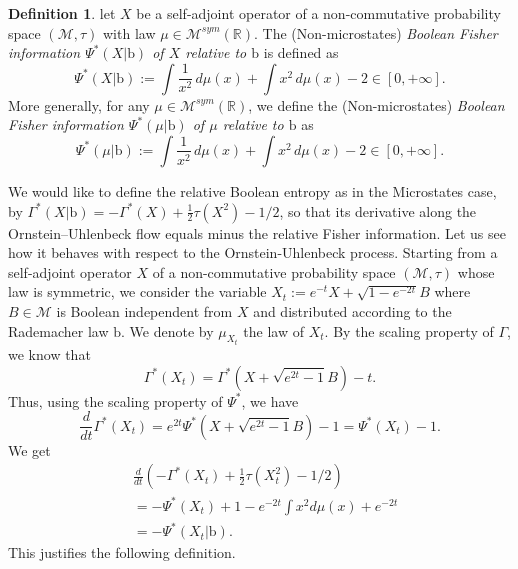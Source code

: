 \documentclass[10pt, reqno]{amsart}
\numberwithin{equation}{section}
\theoremstyle{definition}
\newtheorem{definition}{Definition}[section]
\theoremstyle{plain}
\theoremstyle{remark}
\newcommand{\R}{\mathbb{R}}
\newcommand{\1}{\mathbbm{1}}
\begin{document}
        \begin{definition}
let $X$ be a self-adjoint operator of a non-commutative probability space $(\mathcal{M},\tau)$ with law $\mu\in\mathcal{M}^{sym}(\R)$. The (Non-microstates) \textit{Boolean Fisher information $\Psi^*(X|\mathbb{\mathrm{b}})$ of $X$ relative to $\mathbb{\mathrm{b}}$}  is defined as
\begin{equation}
		\Psi^*(X|\mathbb{\mathrm{b}}):=\int \frac{1}{x^2}\,d\mu(x)+ \int x^2\,d\mu(x)-2\in [0,+\infty].
	\end{equation}
    More generally, for any $\mu \in\mathcal{M}^{sym}(\R)$, we define the (Non-microstates) \textit{Boolean Fisher information $\Psi^*(\mu|\mathbb{\mathrm{b}})$ of $\mu$ relative to $\mathbb{\mathrm{b}}$}   as
\begin{equation*}
		\Psi^*(\mu|\mathbb{\mathrm{b}}):=\int \frac{1}{x^2}\,d\mu(x)+ \int x^2\,d\mu(x)-2\in [0,+\infty].
	\end{equation*}
\end{definition}
We would like to define the relative Boolean entropy as in the Microstates case, by $\Gamma^*(X|\mathbb{\mathrm{b}})=-\Gamma^*(X)+\frac{1}{2}\tau\left(X^2\right)-1/2$, so that its derivative along the Ornstein–Uhlenbeck flow equals minus the relative Fisher information. Let us see how it behaves with respect to the Ornstein-Uhlenbeck process. Starting from a self-adjoint operator $X$ of a non-commutative probability space $(\mathcal{M},\tau)$ whose law is symmetric, we consider the variable $X_t:=e^{-t}X + \sqrt{1-e^{-2t}}B$ where $B\in \mathcal{M}$ is Boolean independent from $X$ and distributed according to the Rademacher law $\mathrm{b}.$ We denote by $\mu_{X_t}$ the law of $X_t$.  By the scaling property of $\Gamma$, we know that
	\begin{equation*}
		\Gamma^*(X_t)=\Gamma^*\left(X+\sqrt{e^{2t}-1}B\right)-t.
	\end{equation*}
	Thus, using the scaling property of $\Psi^*$, we have
	\begin{equation}\label{EntOU*}
		\frac{d}{dt}\Gamma^*(X_t)=e^{2t}\Psi^*\left(X+\sqrt{e^{2t}-1}B\right)-1= \Psi^*(X_t)-1.
	\end{equation}We get
	\begin{align}\label{relafisher*}
		\nonumber
		&\frac{d}{dt}\left(-\Gamma^*(X_t)+\frac{1}{2}\tau\left(X_t^2\right)-1/2\right)\\
        &= -\Psi^*(X_t) +1 - e^{-2t}\int x^2 d\mu(x) + e^{-2t}\nonumber \\
		&=  -\Psi^*(X_t|\mathbb{\mathrm{b}}).
	\end{align} This justifies the following definition.
\end{document}
